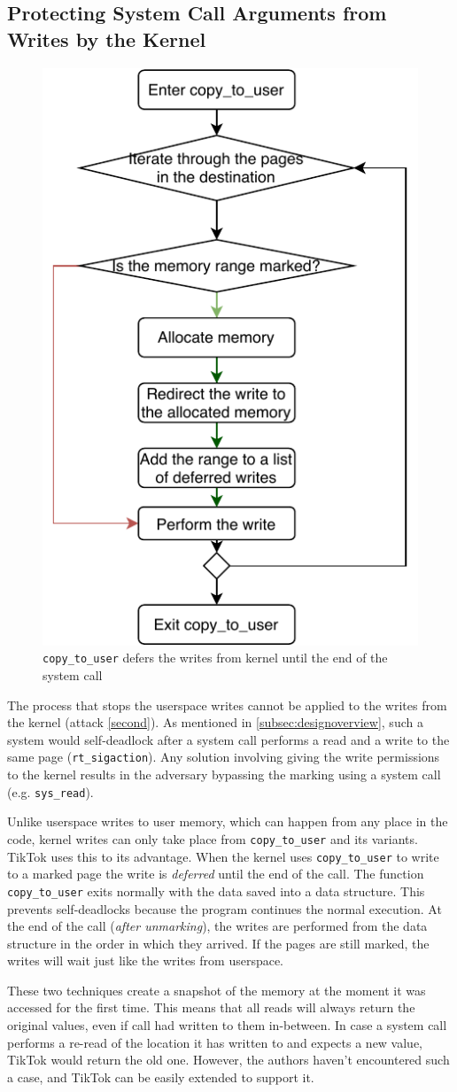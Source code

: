 \subsection{Protecting System Call Arguments from Writes by the Kernel}
\label{subsec:kernelland}
\begin{figure}[]
  \centering
  \includegraphics[width = .30 \textwidth]{img/copy_to_user.pdf}
  \caption{\texttt{copy\_to\_user} defers the writes from kernel until the end
  of the system call}
  \label{fig:copytouser}
\end{figure}

The process that stops the userspace writes cannot be applied to the writes from
the kernel (attack \ref{second}). As mentioned in \cref{subsec:designoverview},
such a system would self-deadlock after a system call performs a read and a
write to the same page (\texttt{rt\_sigaction}). Any solution involving giving
the write permissions to the kernel results in the adversary bypassing the
marking using a system call (e.g. \texttt{sys\_read}).

Unlike userspace writes to user memory, which can happen from any place in the
code, kernel writes can only take place from \texttt{copy\_to\_user} and its
variants. TikTok uses this to its advantage. When the kernel uses
\texttt{copy\_to\_user} to write to a marked page the write is \emph{deferred}
until the end of the call. The function \texttt{copy\_to\_user} exits normally
with the data saved into a data structure. This prevents self-deadlocks because
the program continues the normal execution. At the end of the call (\emph{after
unmarking}), the writes are performed from the data structure in the order in
which they arrived. If the pages are still marked, the writes will wait just
like the writes from userspace.

These two techniques create a snapshot of the memory at the moment it
was accessed for the first time. This means that all reads will always return
the original values, even if call had written to them in-between. In case a
system call performs a re-read of the location it has written to and expects a
new value, TikTok would return the old one. However, the authors haven't
encountered such a case, and TikTok can be easily extended to support it.

